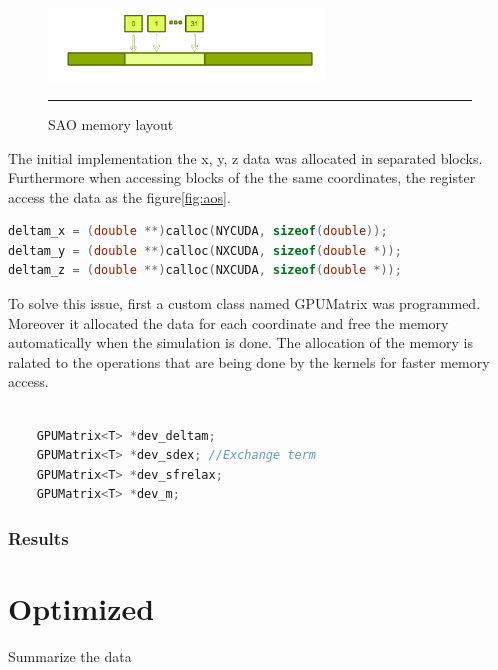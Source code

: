 \begin{figure}[htbp]
	\centering
		\includegraphics[width=0.65\textwidth]{Figures/soa.png}
		\rule{35em}{0.2pt}
	\caption[Structure of Arrays (SAO)]{SAO memory layout}
	\label{fig:sao}
\end{figure}


The initial implementation the  x, y, z data was allocated in separated blocks. Furthermore when accessing blocks of the the same coordinates, the register access the data as the figure\ref{fig:aos}.

\begin{lstlisting}[language=C++, caption={AOS implementation}]
deltam_x = (double **)calloc(NYCUDA, sizeof(double));
deltam_y = (double **)calloc(NXCUDA, sizeof(double *));
deltam_z = (double **)calloc(NXCUDA, sizeof(double *));
\end{lstlisting}

To solve this issue, first a custom class named GPUMatrix was programmed. Moreover it allocated the data for each coordinate and free the memory automatically when the simulation is done. The allocation of the memory is ralated to the operations that are being done by the kernels for faster memory access. 

\begin{lstlisting}[language=C++, caption={SOA implementation}]

    GPUMatrix<T> *dev_deltam;
    GPUMatrix<T> *dev_sdex; //Exchange term
    GPUMatrix<T> *dev_sfrelax;
    GPUMatrix<T> *dev_m; 
\end{lstlisting}

\subsubsection{Results}



\section{Optimized}



Summarize the data

